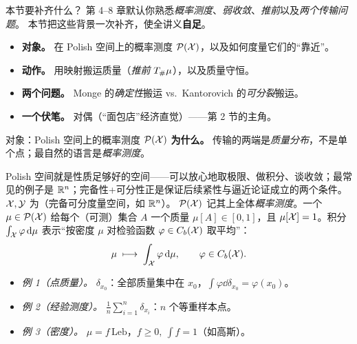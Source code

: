 
\begin{frame}{本节要补齐什么？}
  第 4--8 章默认你熟悉\emph{概率测度}、\emph{弱收敛}、\emph{推前}以及\emph{两个传输问题}。
  本节把这些背景一次补齐，使全讲义\textbf{自足}。
  \begin{itemize}
    \item \textbf{对象。} 在 Polish 空间上的概率测度 $\mathcal{P}(\mathcal{X})$，以及如何度量它们的“靠近”。
    \item \textbf{动作。} 用映射搬运质量（\emph{推前} ${T}_{\#}\mu$），以及质量守恒。
    \item \textbf{两个问题。} Monge 的\emph{确定性}搬运 vs.\ Kantorovich 的\emph{可分裂}搬运。
    \item \textbf{一个伏笔。} 对偶（“面包店”经济直觉）——第 2 节的主角。
  \end{itemize}
\end{frame}

\begin{frame}{对象：Polish 空间上的概率测度 $\mathcal{P}(\mathcal{X})$}
  \textbf{为什么。} 传输的两端是\emph{质量分布}，不是单个点；最自然的语言是\emph{概率测度}。

   Polish 空间就是性质足够好的空间——可以放心地取极限、做积分、谈收敛；最常见的例子是 $\mathbb{R}^{n}$；完备性+可分性正是保证后续紧性与逼近论证成立的两个条件。
   $\mathcal{X},\mathcal{Y}$ 为（完备可分度量空间，如 $\mathbb{R}^n$）。
  $\mathcal{P}(\mathcal{X})$ 记其上全体\emph{概率测度}。一个 $\mu\in\mathcal{P}(\mathcal{X})$ 给每个（可测）集合 $A$ 一个质量
  $\mu[A]\in[0,1]$，且 $\mu[\mathcal{X}]=1$。积分 $\int_{\mathcal{X}} \varphi \,\mathrm{d}\mu$ 表示“按密度 $\mu$
  对检验函数 $\varphi\in C_b(\mathcal{X})$ 取平均”：
  \[
    \mu \;\longmapsto\; \int_{\mathcal{X}} \varphi \,\mathrm{d}\mu, \qquad \varphi\in C_b(\mathcal{X}).
  \]
  \begin{itemize}\small
    \item \emph{例 1（点质量）。} $\delta_{x_0}$：全部质量集中在 $x_0$，$\int\varphi\dd\delta_{x_0}=\varphi(x_0)$。
    \item \emph{例 2（经验测度）。} $\frac1n\sum_{i=1}^n\delta_{x_i}$：$n$ 个等重样本点。
    \item \emph{例 3（密度）。} $\mu=f\,\mathrm{Leb}$，$f\ge0,\ \int f=1$（如高斯）。
  \end{itemize}
  \vspace{-4pt}
\end{frame}


